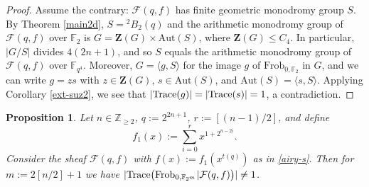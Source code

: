 \documentclass[11pt]{amsart}
\theoremstyle{plain}
\newtheorem{prop}[thm]{Proposition}
\theoremstyle{definition}
\numberwithin{thm}{section}
\numberwithin{equation}{thm}
\newcommand{\Trace}{{\rm Trace}}
\newcommand{\Aut}{\mathrm{Aut}}
\newcommand{\sF}{{\mathcal F}}
\newcommand{\F}{{\mathbb F}}
\newcommand{\Z}{{\mathbb Z}}
\newcommand{\0}{\emptyset}
\newcommand{\ZB}{{\mathbf Z}}
\newcommand{\tw}[1]{{}^#1\!}
\newcommand{\Frob}{\mathrm{Frob}}
\begin{document}
\begin{proof}
Assume the contrary: $\sF(q,f)$ has finite geometric monodromy group $S$. By Theorem \ref{main2d}, 
$S=\tw2 B_2(q)$ and the arithmetic monodromy group of $\sF(q,f)$ over $\F_2$ is $G = \ZB(G) \times \Aut(S)$,
where $\ZB(G) \leq C_4$. In particular, $|G/S|$ divides $4(2n+1)$, and so $S$ equals the arithmetic monodromy group
of $\sF(q,f)$ over $\F_{q^4}$. Moreover, $G = \langle g,S \rangle$ for the image $g$ of $\Frob_{0,\F_2}$ in $G$, and 
we can write $g=zs$ with $z \in \ZB(G)$, $s \in \Aut(S)$, and $\Aut(S) = \langle s,S \rangle$. Applying 
Corollary \ref{ext-suz2}, we see that $|\Trace(g)| = |\Trace(s)|=1$, a contradiction.
\end{proof}
 
\begin{prop}\label{traces-f0c}
Let $n \in \Z_{\geq 2}$, $q:=2^{2n+1}$, 
$r:=[(n-1)/2]$, and define 
$$f_1(x):= \sum^r_{i=0}x^{1+2^{n-2i}}.$$
Consider the sheaf $\sF(q,f)$ with $f(x):=f_1(x^{t(q)})$ as in \eqref{airy-s}. 
Then for $m:= 2[n/2]+1$ we have
$|\Trace\bigl(\Frob_{0,\F_{2^m}}|\sF(q,f)\bigr)| \neq 1$.
\end{prop}
\end{document}
